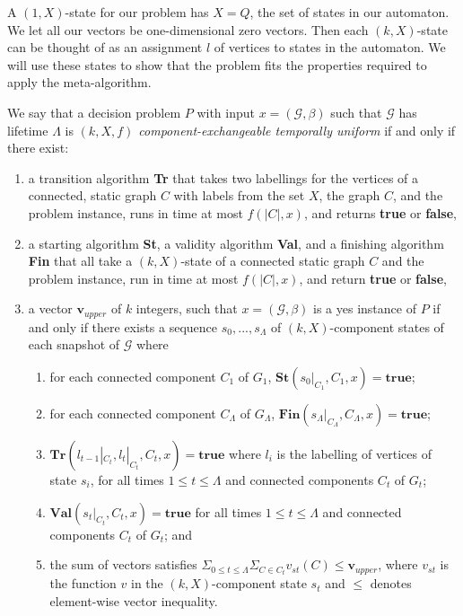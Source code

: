 \documentclass[runningheads]{llncs}
\begin{document}
A $(1,X)$-state for our problem has $X=Q$, the set of states in our automaton. We let all our vectors be one-dimensional zero vectors. Then each $(k,X)$-state can be thought of as an assignment $l$ of vertices to states in the automaton. We will use these states to show that the problem fits the properties required to apply the meta-algorithm.

\begin{definition} \label{def:kxf problem}
We say that a decision problem $P$ with input $x = (\mathcal{G},\beta)$ such that $\mathcal{G}$ has lifetime $\Lambda$ is \emph{$(k,X,f)$
component-exchangeable temporally uniform} if and only if there exist:
\begin{enumerate}
    \item a transition algorithm \textbf{Tr} that takes two labellings for the vertices of a connected, static graph $C$ with labels from the set $X$, the graph $C$, and the problem instance, runs in time
at most $f(|C|,x)$, and returns \textbf{true} or \textbf{false},
\item a starting algorithm \textbf{St}, a validity algorithm \textbf{Val}, and a finishing algorithm \textbf{Fin} that all
take a $(k,X)$-state of a connected static graph $C$ and the problem instance, run in time
at most $f(|C|,x)$, and return \textbf{true} or \textbf{false},
\item a vector $\textbf{v}_{upper}$ of $k$ integers, such that $x = (\mathcal{G},\beta)$ is a yes instance of $P$ if and only if there exists a sequence $s_0,...,s_{\Lambda}$ of
$(k,X)$-component states of each snapshot of $\mathcal{G}$ where
\begin{enumerate} 
    \item for each connected component $C_1$ of $G_1$, $\textbf{St}(s_0|_{C_1}, C_1,x) = \textbf{true}$;
\item for each connected component $C_\Lambda$ of $G_\Lambda$, $\textbf{Fin}(s_\Lambda |_{C_\Lambda},C_\Lambda,x) = \textbf{true}$;
\item $\textbf{Tr}(l_{t-1}|_{C_t},l_t|_{C_t},C_t,x) = \textbf{true}$ where $l_i$ is the labelling of vertices of state $s_i$, for all times $1 \leq t \leq \Lambda$ and connected components $C_t$ of $G_t$;
\item $\textbf{Val}(s_t|_{C_t},C_t,x) = \textbf{true}$ for all times $1 \leq t \leq \Lambda$ and connected components $C_t$ of $G_t$; and
\item the sum of vectors satisfies $\Sigma_{0\leq t\leq \Lambda} \Sigma_{C \in C_t} v_{st}(C) \leq \textbf{v}_{upper}$, where $v_{st}$ is the function $v$ in
the $(k,X)$-component state $s_t$ and $\leq$ denotes element-wise vector inequality.
\end{enumerate}
\end{enumerate}
\end{definition}
\end{document}
